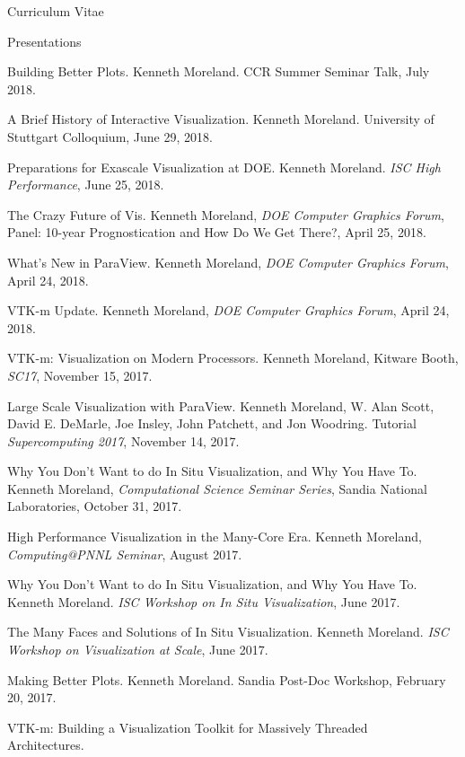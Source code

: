 \documentclass{article}
\begin{document}
\begin{cv}{Curriculum Vitae}
    \begin{cvlist}{Presentations}
    \item[Building Better Plots.]
      Kenneth Moreland.
      CCR Summer Seminar Talk, July 2018.
    \item[A Brief History of Interactive Visualization.]
      Kenneth Moreland.
      University of Stuttgart Colloquium, June 29, 2018.
    \item[Preparations for Exascale Visualization at DOE.]
      Kenneth Moreland.
      \emph{ISC High Performance}, June 25, 2018.
    \item[The Crazy Future of Vis.]
      Kenneth Moreland, \emph{DOE Computer Graphics Forum}, Panel: 10-year Prognostication and How Do We Get There?, April 25, 2018.
    \item[What's New in ParaView.]
      Kenneth Moreland, \emph{DOE Computer Graphics Forum}, April 24, 2018.
    \item[VTK-m Update.]
      Kenneth Moreland, \emph{DOE Computer Graphics Forum}, April 24, 2018.
    \item[VTK-m: Visualization on Modern Processors.]
      Kenneth Moreland, Kitware Booth, \emph{SC17}, November 15, 2017.
    \item[Large Scale Visualization with ParaView.]
      Kenneth Moreland, W. Alan Scott, David E. DeMarle, Joe Insley, John Patchett, and Jon Woodring.
      Tutorial \emph{Supercomputing 2017}, November 14, 2017.
    \item[Why You Don't Want to do In Situ Visualization, and Why You Have To.]
      Kenneth Moreland, \emph{Computational Science Seminar Series}, Sandia National Laboratories, October 31, 2017.
    \item[High Performance Visualization in the Many-Core Era.]
      Kenneth Moreland, \emph{Computing@PNNL Seminar}, August 2017.
    \item[Why You Don't Want to do In Situ Visualization, and Why You Have To.]
      Kenneth Moreland.
      \emph{ISC Workshop on In Situ Visualization}, June 2017.
    \item[The Many Faces and Solutions of In Situ Visualization.]
      Kenneth Moreland.
      \emph{ISC Workshop on Visualization at Scale}, June 2017.
    \item[Making Better Plots.]
      Kenneth Moreland.
      Sandia Post-Doc Workshop, February 20, 2017.
    \item[VTK-m: Building a Visualization Toolkit for Massively Threaded]~\\ Architectures.

\end{cvlist}
\end{cv}
\end{document}
